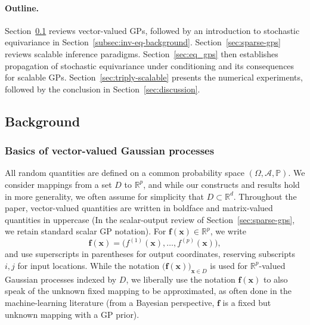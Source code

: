 \documentclass[11pt,a4paper]{article}
\begin{document}
\paragraph{Outline.} Section~\ref{subsec:background} reviews vector-valued GPs, followed by an introduction to stochastic equivariance in Section~\ref{subsec:inv-eq-background}. Section~\ref{sec:sparse-gps} reviews scalable inference paradigms. Section~\ref{sec:eq_gps} then establishes propagation of stochastic equivariance under conditioning and its consequences for scalable GPs. Section~\ref{sec:triply-scalable} presents the numerical experiments, followed by the conclusion in Section~\ref{sec:discussion}.

\subsection{Background}
\label{subsec:background}

\newcommand{\myf}{\boldsymbol{f}}

\subsubsection{Basics of vector-valued Gaussian processes}
\label{subsec:vv-gps}
All random quantities are defined on a common probability space $(\Omega,\mathcal{A},\mathbb{P})$. We consider mappings from 
a set $D$ to $\mathbb{R}^p$, and while our constructs and results hold in more generality, we often assume for simplicity that $D \subset \mathbb{R}^d$. Throughout the paper, vector-valued quantities are written in boldface and matrix-valued quantities in uppercase (In the scalar-output review of Section~\ref{sec:sparse-gps}, we retain standard scalar GP notation).
For $\myf(\boldsymbol{x})\in\mathbb{R}^p$, we write
\begin{displaymath}\myf(\boldsymbol{x}) = \bigl( f^{(1)}(\boldsymbol{x}),\dots,f^{(p)}(\boldsymbol{x}) \bigr),\end{displaymath}
and use superscripts in parentheses for output coordinates, reserving subscripts $i,j$ for input locations.
While the notation 
$\bigl(\myf(\boldsymbol{x})\bigr)_{\boldsymbol{x}\in D}$ 
is used for $\mathbb{R}^p$-valued Gaussian processes indexed by $D$, we liberally use the notation $\myf(\boldsymbol{x})$ to also speak of the unknown fixed mapping to be approximated, as often done in the machine-learning literature (from a Bayesian perspective, $\myf$ is a fixed but unknown mapping with a GP prior). 
\end{document}
